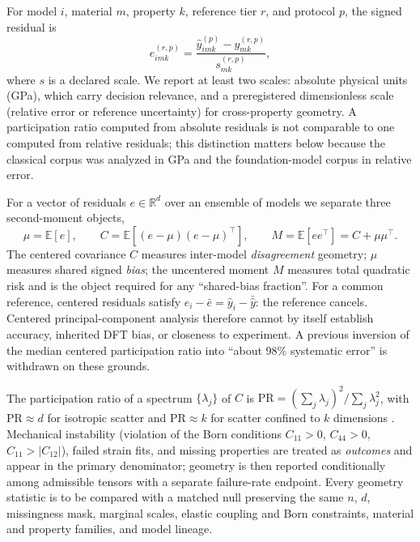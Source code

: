 \documentclass[11pt]{article}
\newcommand{\PR}{\mathrm{PR}}
\begin{document}
For model $i$, material $m$, property $k$, reference tier $r$, and protocol $p$, the signed residual is
\begin{equation}
e^{(r,p)}_{imk} = \frac{\hat y^{(p)}_{imk} - y^{(r,p)}_{mk}}{s^{(r,p)}_{mk}},
\label{eq:residual}
\end{equation}
where $s$ is a declared scale. We report at least two scales: absolute physical units (GPa), which carry decision relevance, and a preregistered dimensionless scale (relative error or reference uncertainty) for cross-property geometry. A participation ratio computed from absolute residuals is not comparable to one computed from relative residuals; this distinction matters below because the classical corpus was analyzed in GPa and the foundation-model corpus in relative error.

For a vector of residuals $e\in\mathbb R^d$ over an ensemble of models we separate three second-moment objects,
\begin{equation}
\mu = \mathbb E[e],\qquad C = \mathbb E[(e-\mu)(e-\mu)^{\!\top}],\qquad M = \mathbb E[ee^{\!\top}] = C + \mu\mu^{\!\top}.
\label{eq:moments}
\end{equation}
The centered covariance $C$ measures inter-model \emph{disagreement} geometry; $\mu$ measures shared signed \emph{bias}; the uncentered moment $M$ measures total quadratic risk and is the object required for any ``shared-bias fraction''. For a common reference, centered residuals satisfy $e_i-\bar e = \hat y_i - \bar{\hat y}$: the reference cancels. Centered principal-component analysis therefore cannot by itself establish accuracy, inherited DFT bias, or closeness to experiment. A previous inversion of the median centered participation ratio into ``about 98\% systematic error'' is withdrawn on these grounds.

The participation ratio of a spectrum $\{\lambda_j\}$ of $C$ is $\PR = (\sum_j\lambda_j)^2/\sum_j\lambda_j^2$, with $\PR\approx d$ for isotropic scatter and $\PR\approx k$ for scatter confined to $k$ dimensions \citep{transtrum2011}. Mechanical instability (violation of the Born conditions $C_{11}>0$, $C_{44}>0$, $C_{11}>|C_{12}|$), failed strain fits, and missing properties are treated as \emph{outcomes} and appear in the primary denominator; geometry is then reported conditionally among admissible tensors with a separate failure-rate endpoint. Every geometry statistic is to be compared with a matched null preserving the same $n$, $d$, missingness mask, marginal scales, elastic coupling and Born constraints, material and property families, and model lineage.
\end{document}
